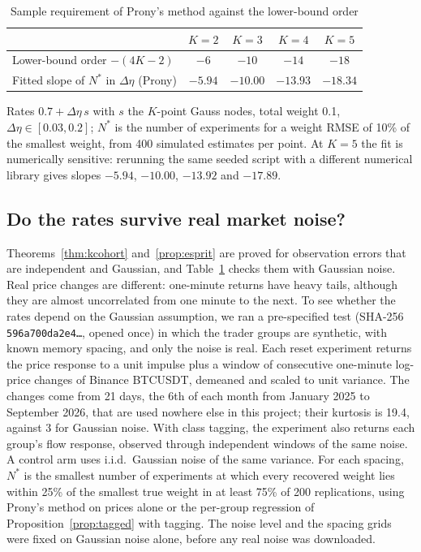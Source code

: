 \documentclass[12pt]{article}
\theoremstyle{definition}
\theoremstyle{remark}
\begin{document}
\begin{table}[t]\centering\small
\begin{threeparttable}
\caption{Sample requirement of Prony's method against the lower-bound order}\label{tab:kupper}
\begin{tabular}{lcccc}
\toprule
 & $K=2$ & $K=3$ & $K=4$ & $K=5$\\
\midrule
Lower-bound order $-(4K-2)$ & $-6$ & $-10$ & $-14$ & $-18$\\
Fitted slope of $N^*$ in $\Delta\eta$ (Prony) & $-5.94$ & $-10.00$ & $-13.93$ & $-18.34$\\
\bottomrule
\end{tabular}
\begin{tablenotes}\footnotesize\item Rates $0.7+\Delta\eta\,s$ with $s$ the $K$-point Gauss nodes, total weight 0.1, $\Delta\eta\in[0.03,0.2]$; $N^*$ is the number of experiments for a weight RMSE of 10\% of the smallest weight, from 400 simulated estimates per point. At $K=5$ the fit is numerically sensitive: rerunning the same seeded script with a different numerical library gives slopes $-5.94$, $-10.00$, $-13.92$ and $-17.89$. \end{tablenotes}
\end{threeparttable}
\end{table}

\subsection{Do the rates survive real market noise?}\label{sec:injection}

Theorems~\ref{thm:kcohort} and~\ref{prop:esprit} are proved for observation errors that are independent and Gaussian, and Table~\ref{tab:kupper} checks them with Gaussian noise. Real price changes are different: one-minute returns have heavy tails, although they are almost uncorrelated from one minute to the next. To see whether the rates depend on the Gaussian assumption, we ran a pre-specified test (SHA-256 \texttt{596a700da2e4\ldots}, opened once) in which the trader groups are synthetic, with known memory spacing, and only the noise is real. Each reset experiment returns the price response to a unit impulse plus a window of consecutive one-minute log-price changes of Binance BTCUSDT, demeaned and scaled to unit variance. The changes come from 21 days, the 6th of each month from January 2025 to September 2026, that are used nowhere else in this project; their kurtosis is 19.4, against 3 for Gaussian noise. With class tagging, the experiment also returns each group's flow response, observed through independent windows of the same noise. A control arm uses i.i.d.\ Gaussian noise of the same variance. For each spacing, $N^*$ is the smallest number of experiments at which every recovered weight lies within 25\% of the smallest true weight in at least 75\% of 200 replications, using Prony's method on prices alone or the per-group regression of Proposition~\ref{prop:tagged} with tagging. The noise level and the spacing grids were fixed on Gaussian noise alone, before any real noise was downloaded.
\end{document}
